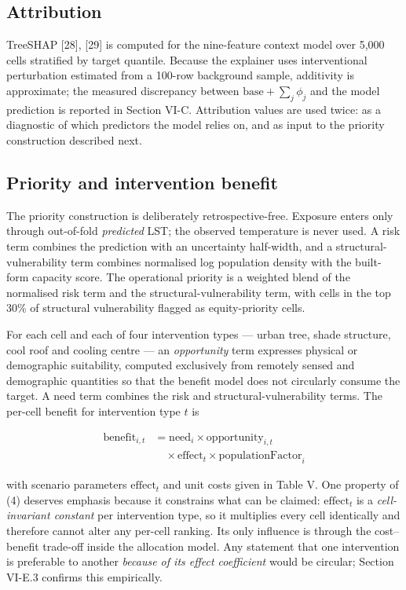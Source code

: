 \subsection{Attribution}\label{f.-attribution}

TreeSHAP {[}28{]}, {[}29{]} is computed for the nine-feature context model over 5,000 cells stratified by
target quantile. Because the explainer uses interventional perturbation estimated from a 100-row
background sample, additivity is approximate; the measured discrepancy between
\(\mathrm{base} + \sum_j \phi_j\) and the model prediction is reported in Section VI-C. Attribution
values are used twice: as a diagnostic of which predictors the model relies on, and as input to the
priority construction described next.

\subsection{Priority and intervention benefit}\label{g.-priority-and-intervention-benefit}

The priority construction is deliberately retrospective-free. Exposure enters only through
out-of-fold \emph{predicted} LST; the observed temperature is never used. A risk term combines the
prediction with an uncertainty half-width, and a structural-vulnerability term combines normalised
log population density with the built-form capacity score. The operational priority is a weighted
blend of the normalised risk term and the structural-vulnerability term, with cells in the top 30\% of
structural vulnerability flagged as equity-priority cells.

For each cell and each of four intervention types --- urban tree, shade structure, cool roof and
cooling centre --- an \emph{opportunity} term expresses physical or demographic suitability, computed
exclusively from remotely sensed and demographic quantities so that the benefit model does not
circularly consume the target. A need term combines the risk and structural-vulnerability terms. The
per-cell benefit for intervention type \(t\) is

\[\begin{aligned}\mathrm{benefit}_{i,t} &= \mathrm{need}_i \times \mathrm{opportunity}_{i,t} \\ &\quad \times \mathrm{effect}_t \times \mathrm{populationFactor}_i \end{aligned} \tag{4}\]

with scenario parameters \(\mathrm{effect}_t\) and unit costs given in Table V. One property of (4)
deserves emphasis because it constrains what can be claimed: \(\mathrm{effect}_t\) is a
\emph{cell-invariant constant} per intervention type, so it multiplies every cell identically and
therefore cannot alter any per-cell ranking. Its only influence is through the cost--benefit
trade-off inside the allocation model. Any statement that one intervention is preferable to another
\emph{because of its effect coefficient} would be circular; Section VI-E.3 confirms this empirically.

